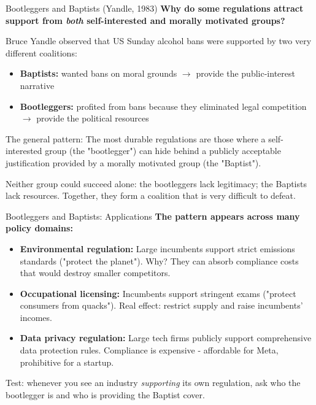 \documentclass[10pt]{beamer}
\begin{document}
\begin{frame}[allowframebreaks]{Bootleggers and Baptists (Yandle, 1983)}
\textbf{Why do some regulations attract support from \emph{both} self-interested and morally motivated groups?}

\vspace{0.1cm}
Bruce Yandle observed that US Sunday alcohol bans were supported by two very different coalitions:
\begin{itemize}
\item \textbf{Baptists:} wanted bans on moral grounds $\rightarrow$ provide the \alert{public-interest narrative}
\item \textbf{Bootleggers:} profited from bans because they eliminated legal competition $\rightarrow$ provide the \alert{political resources}
\end{itemize}

\vspace{0.1cm}
\alert{The general pattern:}
The most durable regulations are those where a self-interested group (the "bootlegger") can hide behind a publicly acceptable justification provided by a morally motivated group (the "Baptist").

\vspace{0.1cm}
Neither group could succeed alone: the bootleggers lack legitimacy; the Baptists lack resources.
Together, they form a coalition that is very difficult to defeat.
\end{frame}


\begin{frame}{Bootleggers and Baptists: Applications}
\textbf{The pattern appears across many policy domains:}

\vspace{0.1cm}
\begin{itemize}
\item \textbf{Environmental regulation:}
Large incumbents support strict emissions standards ("protect the planet").
Why? They can absorb compliance costs that would \alert{destroy smaller competitors}.

\vspace{0.15cm}
\item \textbf{Occupational licensing:}
Incumbents support stringent exams ("protect consumers from quacks").
Real effect: restrict supply and raise incumbents' incomes.

\vspace{0.15cm}
\item \textbf{Data privacy regulation:}
Large tech firms publicly support comprehensive data protection rules.
Compliance is expensive - affordable for Meta, prohibitive for a startup.
\end{itemize}

\vspace{0.1cm}
\alert{Test:} whenever you see an industry \emph{supporting} its own regulation, ask who the bootlegger is and who is providing the Baptist cover.
\end{frame}
\end{document}
